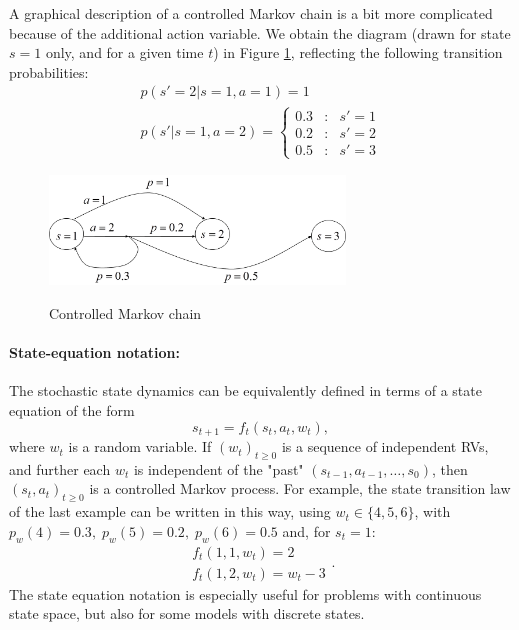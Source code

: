 A graphical description of a controlled Markov chain is a bit more complicated because of the additional action variable. We obtain the diagram (drawn for state $s = 1$ only, and for a given time $t$) in Figure \ref{fig:MDP}, reflecting the following transition probabilities:
\[\begin{array}{l}
p(s' = 2|s = 1,a = 1) = 1\\
p(s'|s = 1,a = 2) = \left\{ {\begin{array}{*{20}{c}}
{0.3}&:&{s' = 1}\\
{0.2}&:&{s' = 2}\\
{0.5}&:&{s' = 3}
\end{array}} \right.
\end{array}\]

\begin{figure}
  \begin{centering}
  \includegraphics[width=0.7\textwidth]{lecture4_b}\\
  \caption{Controlled Markov chain}\label{fig:MDP}
  \end{centering}
\end{figure}


\paragraph{State-equation notation:}
The stochastic state dynamics can be equivalently defined in terms of a state equation of the form
                                                   \[{s_{t + 1}} = {f_t}({s_t},{a_t},{w_t}),\]
where ${w_t}$ is a random variable.
 	If  ${({w_t})_{t \ge 0}}$ is a sequence of independent RVs, and further each ${w_t}$ is independent of the "past"  $({s_{t - 1}},{a_{t - 1}}, \ldots, {s_0})$, then ${({s_t},{a_t})_{t \ge 0}}$ is a controlled Markov process.
 	For example, the state transition law of the last example can be written in this way, using
                  ${w_t} \in \{ 4,5,6\} $,  with  ${p_w}(4) = 0.3,\;{p_w}(5) = 0.2,\;{p_w}(6) = 0.5$
and, for ${s_t} = 1$:
    \[\begin{array}{l}
 	{f_t}(1,1,{w_t}) = 2\\
 	{f_t}(1,2,{w_t}) = {w_t} - 3
 	\end{array}.\]
The state equation notation is especially useful for problems with continuous state space, but also for some models with discrete states.


